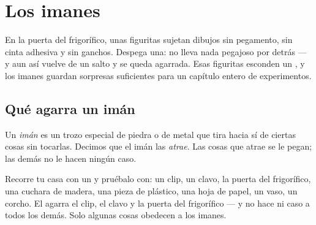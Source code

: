 \chapter{Los imanes}\label{ch:g1:magnets}

En la puerta del frigorífico, unas figuritas sujetan dibujos sin
pegamento, sin cinta adhesiva y sin ganchos. Despega una: no lleva
nada pegajoso por detrás --- y aun así vuelve de un salto y se queda
agarrada. Esas figuritas esconden un , y los imanes guardan
sorpresas suficientes para un capítulo entero de experimentos.

\section{Qué agarra un imán}

\begin{definition}\label{def:g1:magnets:magnet}
Un \emph{imán} es un trozo especial de piedra o de metal
que tira hacia sí de ciertas cosas sin tocarlas. Decimos que el imán
las \emph{atrae}. Las cosas que atrae se le pegan; las
demás no le hacen ningún caso.
\end{definition}

\begin{example}\label{ex:g1:magnets:test}
Recorre tu casa con un  y pruébalo con: un clip, un clavo, la
puerta del frigorífico, una cuchara de madera, una pieza de plástico,
una hoja de papel, un vaso, un corcho. El  agarra el clip, el
clavo y la puerta del frigorífico --- y no hace ni caso a todos los
demás. Solo algunas cosas obedecen a los imanes.
\end{example}

